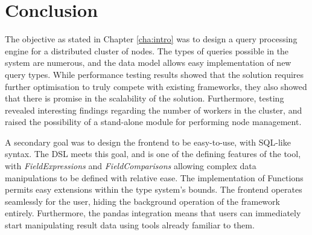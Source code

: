 \section{Conclusion}
The objective as stated in Chapter \ref{cha:intro} was to design a query processing engine for a distributed cluster of nodes. The types of queries possible in the system are numerous, and the data model allows easy implementation of new query types. While performance testing results showed that the solution requires further optimisation to truly compete with existing frameworks, they also showed that there is promise in the scalability of the solution. Furthermore, testing revealed interesting findings regarding the number of workers in the cluster, and raised the possibility of a stand-alone module for performing node management. 

A secondary goal was to design the frontend to be easy-to-use, with SQL-like syntax. The DSL meets this goal, and is one of the defining features of the tool, with \textit{FieldExpressions} and \textit{FieldComparisons} allowing complex data manipulations to be defined with relative ease. The implementation of Functions permits easy extensions within the type system's bounds. The frontend operates seamlessly for the user, hiding the background operation of the framework entirely. Furthermore, the pandas integration means that users can immediately start manipulating result data using tools already familiar to them.